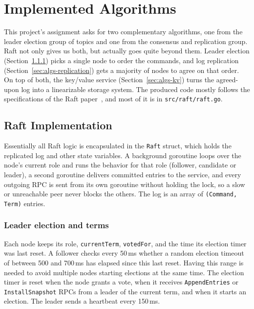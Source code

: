 \documentclass[conference]{IEEEtran}
\begin{document}
\section{Implemented Algorithms}\label{sec:algs}

This project's assignment asks for two complementary algorithms, one from the leader election group of topics and one from the consensus and replication group. Raft not only gives us both, but actually goes quite beyond them. Leader election (Section~\ref{sec:algs-election}) picks a single node to order the commands, and log replication (Section~\ref{sec:algs-replication}) gets a majority of nodes to agree on that order. On top of both, the key/value service (Section~\ref{sec:algs-kv}) turns the agreed-upon log into a linearizable storage system. The produced code mostly follows the specifications of the Raft paper~\cite{raft2014}, and most of it is in \texttt{src/raft/raft.go}.

\subsection{Raft Implementation}

Essentially all Raft logic is encapsulated in the \texttt{Raft} struct, which holds the replicated log and other state variables. A background goroutine loops over the node's current role and runs the behavior for that role (follower, candidate or leader), a second goroutine delivers committed entries to the service, and every outgoing RPC is sent from its own goroutine without holding the lock, so a slow or unreachable peer never blocks the others. The log is an array of \texttt{(Command, Term)} entries.

\subsubsection{\textbf{Leader election and terms}}\label{sec:algs-election}
Each node keeps its role, \texttt{currentTerm}, \texttt{votedFor}, and the time its election timer was last reset.
A follower checks every 50\,ms whether a random election timeout of between 500 and 700\,ms has elapsed since this last reset.
Having this range is needed to avoid multiple nodes starting elections at the same time. The election timer is reset when the node grants a vote,
when it receives \texttt{AppendEntries} or \texttt{InstallSnapshot} RPCs from a leader of the current term, and when it starts an election. The leader sends a heartbeat every 150\,ms.
\end{document}
